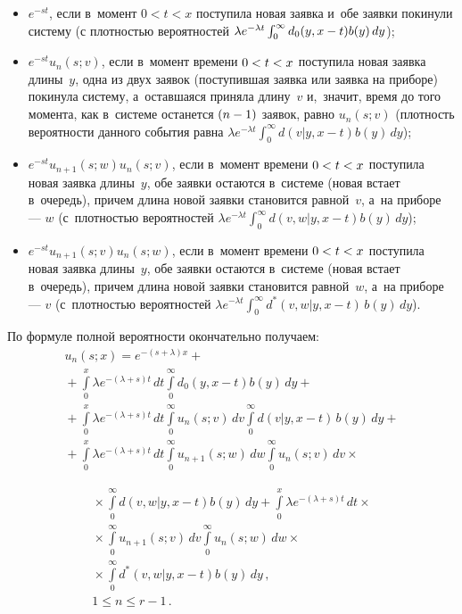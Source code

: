 \begin{multicols}{2}
\begin{itemize}
\item  $e^{-s t}$, если в~момент $0<t<x$
поступила новая заявка и~обе заявки покинули
систему (с плотностью
вероятностей
$ \lambda e^{-\lambda t}
\int\nolimits_0^\infty d_0(y,x\hm-t)b(y)\,dy$);

\item  $e^{-s t} u_{n}(s;v)$, если в~момент времени
$0\hm<t\hm<x$ поступила новая заявка длины~$y$, одна из двух
заявок (поступившая заявка или
заявка на приборе) покинула систему, а~оставшаяся приняла длину~$v$ и,~значит,
время до того момента, как в~системе останется $(n\hm-1)$ заявок,
равно $u_{n}(s;v)$
(плотность вероятности данного события равна
$ \lambda e^{-\lambda t}
\int\nolimits_0^\infty d(v|y,x-t) b(y)\, dy$);

\item  $e^{-s t} u_{n+1}(s;w) u_{n}(s;v)$, если в~момент
времени $0\hm<t\hm<x$ поступила новая заявка длины~$y$,
обе заявки остаются в~системе (новая встает в~очередь),
причем длина новой заявки становится равной~$v$,
а~на приборе --- $w$ (с~плот\-ностью вероятностей
$
\lambda e^{-\lambda t} \int\nolimits_0^\infty
d(v,w|y,x-t) b(y)\, dy$);

\item  $e^{-s t} u_{n+1}(s;v) u_{n}(s;w)$, если в~момент
времени $0\hm<t\hm<x$ поступила новая заявка длины~$y$,
обе заявки остаются в~системе (новая встает в~очередь),
причем длина новой заявки становится равной~$w$,
а~на приборе --- $v$ (с~плот\-ностью вероятностей
$\lambda e^{-\lambda t} \int\nolimits_0^\infty d^*(v,w|y,x-t)\, b(y)\, dy$).
\end{itemize}


По формуле полной вероятности окончательно получаем:
\begin{multline*}
u_{n}(s;x)=e^{-(s+\lambda) x} + {}\\
{}+\int\limits_0^x \lambda e^{-(\lambda+s) t}\,dt
\int\limits_0^\infty d_0(y,x-t)b(y)\,dy+{}
\\
{}+
\int\limits_0^x \lambda e^{-(\lambda+s) t} \,dt \int\limits_0^\infty
 u_{n}(s;v) \, dv \int\limits_0^\infty d(v|y,x-t)\, b(y)\, dy
+{}\\
{}+
\int\limits_0^x \lambda e^{-(\lambda+s) t} \, dt
\int\limits_0^\infty u_{n+1}(s;w)\,dw
\int\limits_0^\infty u_{n}(s;v) \,dv\times{}
\end{multline*}

\noindent
\begin{multline}
{}\times{}
\int\limits_0^\infty d(v,w|y,x-t) b(y)\, dy
+ 
\int\limits_0^x \lambda e^{-(\lambda+s) t} \,dt\times{}\\
{}\times
\int\limits_0^\infty u_{n+1}(s;v) \,dv
\int\limits_0^\infty  u_{n}(s;w)\, dw\times{}\\
{}\times
\int\limits_0^\infty d^*(v,w|y,x-t) b(y)\, dy\,,\\
 1 \le n \le r-1\,.
 \label{t2-mei}
\end{multline}


\end{multicols}
